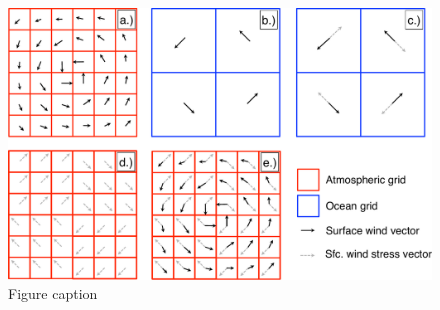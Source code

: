 \documentclass[draft,ms]{AGUTeX}
\begin{document}

%
%
%
%
%
%


\newpage

\begin{figure}
\includegraphics[width=0.8\linewidth]{fig_coupling-schematic.pdf}
\caption{Figure caption}
\label{fig:coupling-schematic}
\end{figure}
\end{document}
